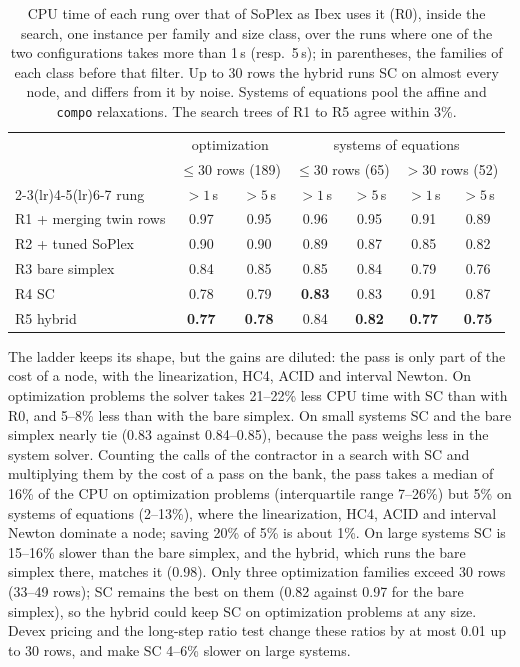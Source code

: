 \documentclass[11pt]{article}
\theoremstyle{definition}
\theoremstyle{remark}
\begin{document}
\begin{table}[t]
\centering
\caption{CPU time of each rung over that of SoPlex as Ibex uses it (R0), inside the
search, one instance per family and size class, over the runs where one of the two
configurations takes more than 1\,s (resp.\ 5\,s); in parentheses, the
families of each class before that filter. Up to 30 rows the hybrid runs SC
on almost every node, and differs from it by noise.
Systems of equations pool the affine and \texttt{compo} relaxations. The
search trees of R1 to R5 agree within 3\%.}
\label{tab:solver}
\begin{tabular}{lcccccc}
\toprule
& \multicolumn{2}{c}{optimization} & \multicolumn{4}{c}{systems of equations}\\
& \multicolumn{2}{c}{$\le30$ rows (189)} & \multicolumn{2}{c}{$\le 30$ rows (65)} & \multicolumn{2}{c}{$>30$ rows (52)}\\
\cmidrule(lr){2-3}\cmidrule(lr){4-5}\cmidrule(lr){6-7}
rung & $>1$\,s & $>5$\,s & $>1$\,s & $>5$\,s & $>1$\,s & $>5$\,s\\
\midrule
R1 + merging twin rows & 0.97 & 0.95 & 0.96 & 0.95 & 0.91 & 0.89\\
R2 + tuned SoPlex      & 0.90 & 0.90 & 0.89 & 0.87 & 0.85 & 0.82\\
R3 bare simplex        & 0.84 & 0.85 & 0.85 & 0.84 & 0.79 & 0.76\\
R4 SC                  & 0.78 & 0.79 & \textbf{0.83} & 0.83 & 0.91 & 0.87\\
R5 hybrid              & \textbf{0.77} & \textbf{0.78} & 0.84 & \textbf{0.82} & \textbf{0.77} & \textbf{0.75}\\
\bottomrule
\end{tabular}
\end{table}

The ladder keeps its shape, but the gains are diluted: the pass is only part of the cost of a
node, with the linearization, HC4, ACID and interval Newton. On optimization
problems the solver takes 21--22\% less CPU time with SC than with R0, and
5--8\% less than with the bare simplex. On small systems SC and the bare simplex nearly tie (0.83 against 0.84--0.85),
because the pass weighs less in the system solver. Counting the calls of the
contractor in a search with SC and multiplying them by the cost of a pass on
the bank, the pass takes a median of 16\% of the CPU on optimization problems
(interquartile range 7--26\%) but 5\% on systems of equations (2--13\%),
where the linearization, HC4, ACID and interval Newton dominate a node; saving
20\% of 5\% is about 1\%. On large systems SC is 15--16\% slower than the bare simplex, and the
hybrid, which runs the bare simplex there, matches it (0.98). Only three optimization
families exceed 30 rows (33--49 rows); SC remains the best on them (0.82
against 0.97 for the bare simplex), so the hybrid could keep SC on
optimization problems at any size. Devex pricing and the long-step ratio test
change these ratios by at most 0.01 up to 30 rows, and make SC 4--6\% slower on large systems.
\end{document}
